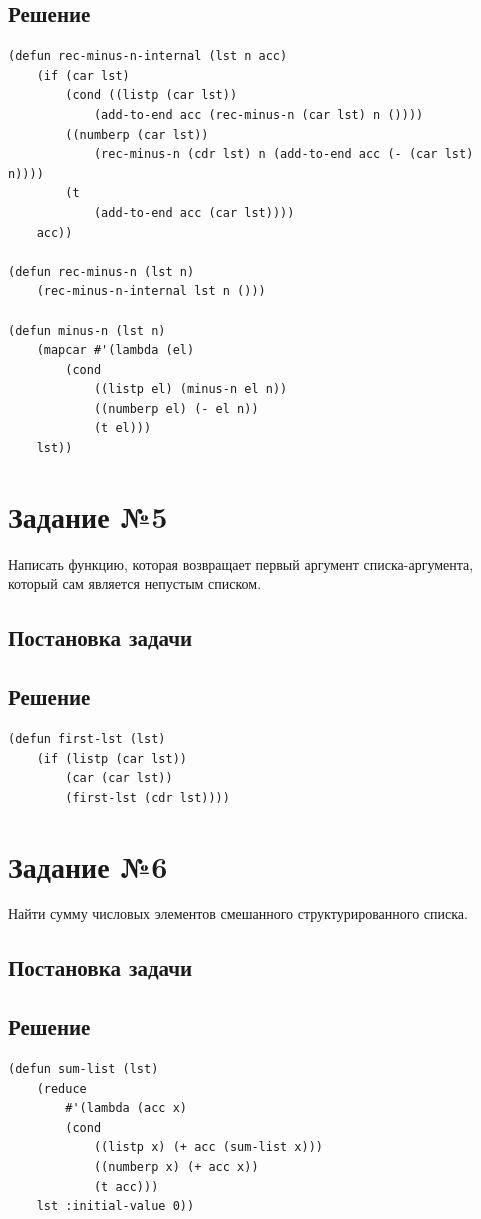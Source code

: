 \documentclass[12pt]{report}
\begin{document}
\subsection*{Решение}
\begin{lstlisting}
(defun rec-minus-n-internal (lst n acc)
	(if (car lst)
		(cond ((listp (car lst))
			(add-to-end acc (rec-minus-n (car lst) n ())))
		((numberp (car lst))
			(rec-minus-n (cdr lst) n (add-to-end acc (- (car lst) n))))
		(t
			(add-to-end acc (car lst))))
	acc))

(defun rec-minus-n (lst n)
	(rec-minus-n-internal lst n ()))

(defun minus-n (lst n)
	(mapcar #'(lambda (el)
		(cond 
			((listp el) (minus-n el n))
			((numberp el) (- el n))
			(t el)))
	lst))
\end{lstlisting}


\section*{Задание №5}
Написать функцию, которая возвращает первый аргумент списка-аргумента, который сам является непустым списком.

\subsection*{Постановка задачи}
\subsection*{Решение}
\begin{lstlisting}
(defun first-lst (lst)
	(if (listp (car lst))
		(car (car lst))
		(first-lst (cdr lst))))
\end{lstlisting}
\clearpage

\section*{Задание №6}
Найти сумму числовых элементов смешанного структурированного списка.

\subsection*{Постановка задачи}
\subsection*{Решение}
\begin{lstlisting}
(defun sum-list (lst)
	(reduce
		#'(lambda (acc x)
		(cond 
			((listp x) (+ acc (sum-list x)))
			((numberp x) (+ acc x))
			(t acc)))
	lst :initial-value 0))
\end{lstlisting}
\end{document}
